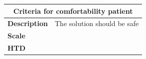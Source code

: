 \documentclass[whitelogo]{tudelft-report}
\begin{document}
{{%
\begin{table}[]
\begin{tabular}{|l|l|l|l|l|}
\hline
\multicolumn{5}{|c|}{\textbf{Criteria for comfortability patient}}                                                                                                                                                                                                                                                                                                                                                                                                                                                                                                                                                                                                                  \\ \hline
\textbf{Description}                & \multicolumn{4}{l|}{The solution should be safe}                                                                                                                                                                                                                                                                                                                                                                                                                                                                                                                                                                                              \\ \hline
\textbf{Scale}                      & \multicolumn{4}{l|}{}                                                                                                                                                                                                                                                                                                                                                                                                                                                                                                                                                                                                                         \\ \hline
\multicolumn{5}{|l|}{\textbf{HTD}}                                                                                                                                                                                                                                                                                                                                                                                                                                                                                                                                                                                                                                                  \\ \hline

\end{tabular}
\end{table}}}
\end{document}
